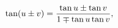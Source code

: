 \[\mathop{\tan\/}\nolimits\!\left(u\pm v\right)=\frac{\mathop{\tan\/}\nolimits u%
\pm\mathop{\tan\/}\nolimits v}{1\mp\mathop{\tan\/}\nolimits u\mathop{\tan\/}%
\nolimits v},\]